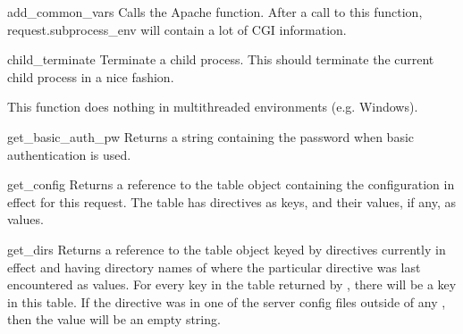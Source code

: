 \begin{methoddesc}[request]{add_common_vars}{}
Calls the Apache  function. After a
call to this function, request.subprocess_env will contain a lot of
CGI information.
\end{methoddesc}

\begin{methoddesc}[request]{child_terminate}{}
Terminate a child process. This should terminate the current child
process in a nice fashion.
                  
This function does nothing in multithreaded environments (e.g. Windows). 
\end{methoddesc}

\begin{methoddesc}[request]{get_basic_auth_pw}{}
Returns a string containing the password when basic authentication is
used.
\end{methoddesc}

\begin{methoddesc}[request]{get_config}{}
Returns a reference to the table object containing the configuration
in effect for this request. The table has directives as keys, and
their values, if any, as values.
\end{methoddesc}

\begin{methoddesc}[request]{get_dirs}{}
Returns a reference to the table object keyed by directives currently
in effect and having directory names of where the particular directive
was last encountered as values. For every key in the table returned by
, there will be a key in this table. If the directive was
in one of the server config files outside of any ,
then the value will be an empty string.
\end{methoddesc}

